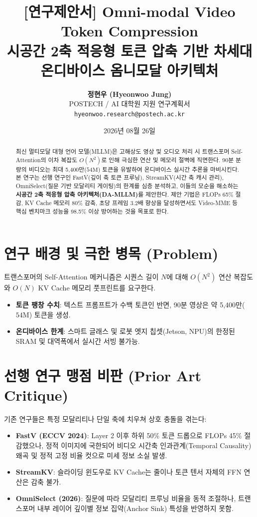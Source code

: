 \documentclass[10pt, a4paper, twocolumn]{article}
\title{\LARGE \textbf{[연구제안서] Omni-modal Video Token Compression}\\[0.3em]
\large 시공간 2축 적응형 토큰 압축 기반 차세대 온디바이스 옴니모달 아키텍처}
\author{\textbf{정현우 (Hyeonwoo Jung)}\\[0.2em]
POSTECH / AI 대학원 지원 연구계획서\\
\texttt{hyeonwoo.research@postech.ac.kr}}
\date{2026년 08월 26일}
\begin{document}
\maketitle

\begin{abstract}
최신 멀티모달 대형 언어 모델(MLLM)은 고해상도 영상 및 오디오 처리 시 트랜스포머 Self-Attention의 이차 복잡도 $O(N^2)$로 인해 극심한 연산 및 메모리 절벽에 직면한다. 90분 분량의 비디오는 최대 5,400만($54\text{M}$) 토큰을 유발하여 온디바이스 실시간 추론을 마비시킨다. 본 연구는 선행 연구인 FastV(깊이 축 토큰 프루닝), StreamKV(시간 축 캐시 관리), OmniSelect(질문 기반 모달리티 게이팅)의 한계를 심층 분석하고, 이들의 모순을 해소하는 \textbf{시공간 2축 적응형 압축 아키텍처(DA-MLLM)}를 제안한다. 제안 기법은 FLOPs 65\% 절감, KV Cache 메모리 80\% 감축, 초당 프레임 3.2배 향상을 달성하면서도 Video-MME 등 핵심 벤치마크 성능을 98.5\% 이상 방어하는 것을 목표로 한다.
\end{abstract}

\section{연구 배경 및 극한 병목 (Problem)}
트랜스포머의 Self-Attention 메커니즘은 시퀀스 길이 $N$에 대해 $O(N^2)$ 연산 복잡도와 $O(N)$ KV Cache 메모리 풋프린트를 요구한다.
\begin{itemize}
    \item \textbf{토큰 팽창 수치}: 텍스트 프롬프트가 수백 토큰인 반면, 90분 영상은 약 5,400만($54\text{M}$) 토큰을 생성.
    \item \textbf{온디바이스 한계}: 스마트 글래스 및 로봇 엣지 칩셋(Jetson, NPU)의 한정된 SRAM 및 대역폭에서 실시간 서빙 불가능.
\end{itemize}

\section{선행 연구 맹점 비판 (Prior Art Critique)}
기존 연구들은 특정 모달리티나 단일 축에 치우쳐 상호 충돌을 겪는다:
\begin{itemize}
    \item \textbf{FastV (ECCV 2024)}: Layer 2 이후 하위 50\% 토큰 드롭으로 FLOPs 45\% 절감했으나, 정적 이미지에 국한되어 비디오 시간축 인과관계(Temporal Causality) 왜곡 및 정적 고정 비율 컷으로 미세 정보 소실 발생.
    \item \textbf{StreamKV}: 슬라이딩 윈도우로 KV Cache는 줄이나 토큰 텐서 자체의 FFN 연산은 감축 불가.
    \item \textbf{OmniSelect (2026)}: 질문에 따라 모달리티 프루닝 비율을 동적 조절하나, 트랜스포머 내부 레이어 깊이별 정보 집약(Anchor Sink) 특성을 반영하지 못함.
\end{itemize}
\end{document}
